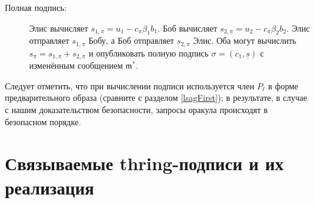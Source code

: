 \documentclass{mrl}
\theoremstyle{definition}
\numberwithin{theorem}{subsection}
\newcommand{\m}{\mathfrak{m}}
\begin{document}
\begin{description}
\item [Полная подпись:] Элис вычисляет $s_{1, \pi} = u_1 - c_\pi \beta_1 b_1$. Боб вычисляет $s_{2, \pi} = u_2 - c_\pi \beta_2 b_2$. Элис отправляет $s_{1, \pi}$ Бобу, а Боб отправляет $s_{2, \pi}$ Элис. Оба могут вычислить $s_\pi = s_{1, \pi} + s_{2, \pi}$ и опубликовать полную подпись $\sigma = (c_1, \underline{s})$ с изменённым сообщением $\m^*$.
\end{description} Следует отметить, что при вычислении подписи используется член $P_\ell$ в форме предварительного образа (сравните с разделом \ref{lsagFirst}); в результате, в случае с нашим доказательством безопасности, запросы оракула происходят в безопасном порядке.

\section{Связываемые thring-подписи и их реализация}\label{schemeAndImp}

\end{document}
